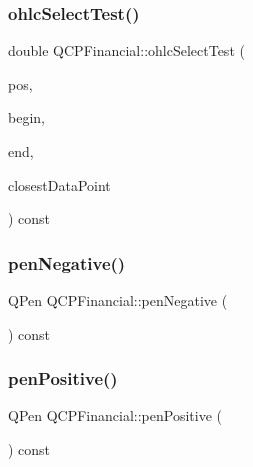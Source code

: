 \subsubsection{\texorpdfstring{ohlc\+Select\+Test()}{ohlcSelectTest()}}
{\footnotesize\ttfamily double Q\+C\+P\+Financial\+::ohlc\+Select\+Test (\begin{DoxyParamCaption}\item[{const Q\+PointF \&}]{pos,  }\item[{const \hyperlink{class_q_c_p_data_container_ae40a91f5cb0bcac61d727427449b7d15}{Q\+C\+P\+Financial\+Data\+Container\+::const\+\_\+iterator} \&}]{begin,  }\item[{const \hyperlink{class_q_c_p_data_container_ae40a91f5cb0bcac61d727427449b7d15}{Q\+C\+P\+Financial\+Data\+Container\+::const\+\_\+iterator} \&}]{end,  }\item[{\hyperlink{class_q_c_p_data_container_ae40a91f5cb0bcac61d727427449b7d15}{Q\+C\+P\+Financial\+Data\+Container\+::const\+\_\+iterator} \&}]{closest\+Data\+Point }\end{DoxyParamCaption}) const\hspace{0.3cm}{\ttfamily [protected]}}

\mbox{\label{class_q_c_p_financial_a25d9a8f256e5ddcba56b6e2e7e968653}} 
\subsubsection{\texorpdfstring{pen\+Negative()}{penNegative()}}
{\footnotesize\ttfamily Q\+Pen Q\+C\+P\+Financial\+::pen\+Negative (\begin{DoxyParamCaption}{ }\end{DoxyParamCaption}) const\hspace{0.3cm}{\ttfamily [inline]}}

\mbox{\label{class_q_c_p_financial_ae803fe25fdd6f0acacde4539590795ed}} 
\subsubsection{\texorpdfstring{pen\+Positive()}{penPositive()}}
{\footnotesize\ttfamily Q\+Pen Q\+C\+P\+Financial\+::pen\+Positive (\begin{DoxyParamCaption}{ }\end{DoxyParamCaption}) const\hspace{0.3cm}{\ttfamily [inline]}}

